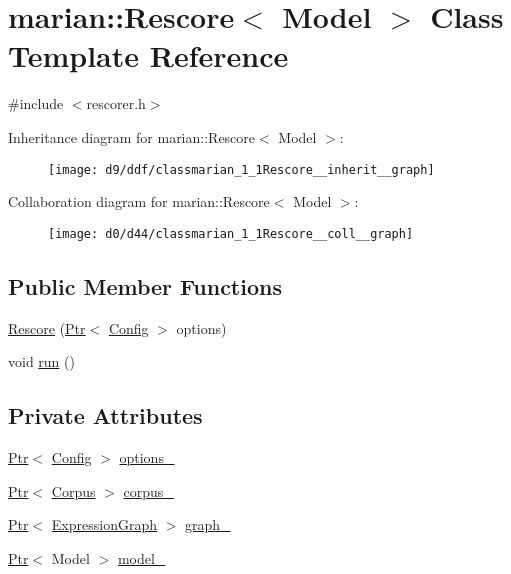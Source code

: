 \hypertarget{classmarian_1_1Rescore}{}\section{marian\+:\+:Rescore$<$ Model $>$ Class Template Reference}
\label{classmarian_1_1Rescore}


{\ttfamily \#include $<$rescorer.\+h$>$}



Inheritance diagram for marian\+:\+:Rescore$<$ Model $>$\+:
\nopagebreak
\begin{figure}[H]
\begin{center}
\leavevmode
\texttt{[image: d9/ddf/classmarian\_1\_1Rescore\_\_inherit\_\_graph]}
\end{center}
\end{figure}


Collaboration diagram for marian\+:\+:Rescore$<$ Model $>$\+:
\nopagebreak
\begin{figure}[H]
\begin{center}
\leavevmode
\texttt{[image: d0/d44/classmarian\_1\_1Rescore\_\_coll\_\_graph]}
\end{center}
\end{figure}
\subsection*{Public Member Functions}
\begin{DoxyCompactItemize}
\item 
\hyperlink{classmarian_1_1Rescore_a5700750a23b0e7e9acaaf10a05dfd65f}{Rescore} (\hyperlink{namespacemarian_ad1a373be43a00ef9ce35666145137b08}{Ptr}$<$ \hyperlink{classmarian_1_1Config}{Config} $>$ options)
\item 
void \hyperlink{classmarian_1_1Rescore_ac514b4d602ec5c08fb0730690327ae3e}{run} ()
\end{DoxyCompactItemize}
\subsection*{Private Attributes}
\begin{DoxyCompactItemize}
\item 
\hyperlink{namespacemarian_ad1a373be43a00ef9ce35666145137b08}{Ptr}$<$ \hyperlink{classmarian_1_1Config}{Config} $>$ \hyperlink{classmarian_1_1Rescore_a364be87ce2541f28ca6065e12955f789}{options\+\_\+}
\item 
\hyperlink{namespacemarian_ad1a373be43a00ef9ce35666145137b08}{Ptr}$<$ \hyperlink{classmarian_1_1data_1_1Corpus}{Corpus} $>$ \hyperlink{classmarian_1_1Rescore_aa4c8b89fe7b567a755cd4511d374aafe}{corpus\+\_\+}
\item 
\hyperlink{namespacemarian_ad1a373be43a00ef9ce35666145137b08}{Ptr}$<$ \hyperlink{classmarian_1_1ExpressionGraph}{Expression\+Graph} $>$ \hyperlink{classmarian_1_1Rescore_a9f6d908e2c46c0b43ca16e61d3c4a618}{graph\+\_\+}
\item 
\hyperlink{namespacemarian_ad1a373be43a00ef9ce35666145137b08}{Ptr}$<$ Model $>$ \hyperlink{classmarian_1_1Rescore_a062b8a1e12c90dbc2b68a7321f8afb67}{model\+\_\+}
\end{DoxyCompactItemize}


